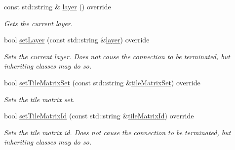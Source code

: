 \begin{DoxyCompactItemize}
const std\+::string \& \hyperlink{classdg_1_1deepcore_1_1imagery_1_1_wmts_client_ab466d3b34f5b8558b4f1a5694b10496d}{layer} () override
\begin{DoxyCompactList}\small\item\em Gets the current layer. \end{DoxyCompactList}\item 
bool \hyperlink{classdg_1_1deepcore_1_1imagery_1_1_wmts_client_a61d18f8e719b505c0f0a6d21e4711c6d}{set\+Layer} (const std\+::string \&\hyperlink{classdg_1_1deepcore_1_1imagery_1_1_wmts_client_ab466d3b34f5b8558b4f1a5694b10496d}{layer}) override
\begin{DoxyCompactList}\small\item\em Sets the current layer. Does not cause the connection to be terminated, but inheriting classes may do so. \end{DoxyCompactList}\item 
bool \hyperlink{classdg_1_1deepcore_1_1imagery_1_1_wmts_client_a0053f545baed6b247f7e4bdf68af8d5c}{set\+Tile\+Matrix\+Set} (const std\+::string \&\hyperlink{group___imagery_module_gae380a970bc0aa63d34e6f2295ea9c8f4}{tile\+Matrix\+Set}) override
\begin{DoxyCompactList}\small\item\em Sets the tile matrix set. \end{DoxyCompactList}\item 
bool \hyperlink{classdg_1_1deepcore_1_1imagery_1_1_wmts_client_affa4f468e78952de79d3d8a49c5a14ab}{set\+Tile\+Matrix\+Id} (const std\+::string \&\hyperlink{group___imagery_module_gae6a1721e1da9ab60ab4e62240baf304b}{tile\+Matrix\+Id}) override
\begin{DoxyCompactList}\small\item\em Sets the tile matrix id. Does not cause the connection to be terminated, but inheriting classes may do so. \end{DoxyCompactList}\end{DoxyCompactItemize}
